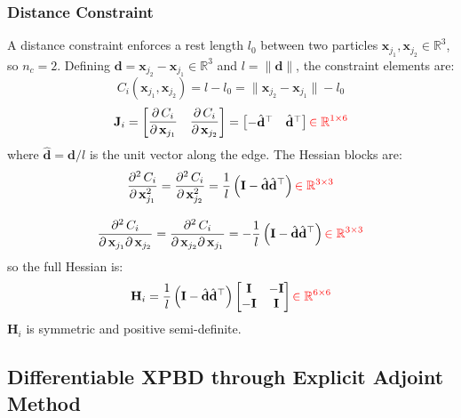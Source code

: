 \documentclass{article}
\newcommand{\pd}[2]{\dfrac{\partial\, #1}{\partial\, #2}}
\newcommand{\pdv}[2]{\dfrac{\partial^2\, #1}{\partial\, #2^2}}
\newcommand{\pdm}[3]{\dfrac{\partial^2\, #1}{\partial\, #2 \partial\, #3}}
\newcommand{\red}[1]{\textcolor{red}{#1}}
\begin{document}
\subsubsection{Distance Constraint}
A distance constraint enforces a rest length $l_0$ between two particles 
$\mathbf{x}_{j_1}, \mathbf{x}_{j_2} \in \mathbb{R}^3$, so $n_c = 2$. 
Defining $\mathbf{d} = \mathbf{x}_{j_2} - \mathbf{x}_{j_1} \in \mathbb{R}^3$ 
and $l = \|\mathbf{d}\|$, the constraint elements are:
\begin{equation*}
    C_i(\mathbf{x}_{j_1}, \mathbf{x}_{j_2}) = l - l_0 = \|\mathbf{x}_{j_2} - \mathbf{x}_{j_1}\| - l_0
\end{equation*}
\begin{equation*}
    \mathbf{J}_i = 
    \begin{bmatrix}
        \displaystyle \pd{C_i}{\mathbf{x}_{j_1}} &
        \displaystyle \pd{C_i}{\mathbf{x}_{j_2}}
    \end{bmatrix}
    =
    \begin{bmatrix}
        -\hat{\mathbf{d}}^\top & \hat{\mathbf{d}}^\top
    \end{bmatrix}
    \red{\in \mathbb{R}^{1 \times 6}}
\end{equation*}
where $\hat{\mathbf{d}} = \mathbf{d}/l$ is the unit vector along the edge. The Hessian blocks are:
\begin{gather*}
\pdv{C_i}{\mathbf{x}_{j_1}} = 
\pdv{C_i}{\mathbf{x}_{j_2}} = 
\frac{1}{l}\left(\mathbf{I} - \hat{\mathbf{d}}\hat{\mathbf{d}}^\top\right)
\red{\in \mathbb{R}^{3\times 3}}
\\[2ex]
\pdm{C_i}{\mathbf{x}_{j_1}}{\mathbf{x}_{j_2}} = 
\pdm{C_i}{\mathbf{x}_{j_2}}{\mathbf{x}_{j_1}} = 
-\frac{1}{l}\left(\mathbf{I} - \hat{\mathbf{d}}\hat{\mathbf{d}}^\top\right)
\red{\in \mathbb{R}^{3\times 3}}
\end{gather*}
so the full Hessian is:
\begin{equation*}
\mathbf{H}_i = 
\frac{1}{l}\left(\mathbf{I} - \hat{\mathbf{d}}\hat{\mathbf{d}}^\top\right)
\begin{bmatrix}
    \mathbf{I} & -\mathbf{I} \\
    -\mathbf{I} & \mathbf{I}
\end{bmatrix}
\red{\in \mathbb{R}^{6 \times 6}}
\end{equation*}
$\mathbf{H}_i$ is symmetric and positive semi-definite.

\subsection{Differentiable XPBD through Explicit Adjoint Method}
\end{document}
